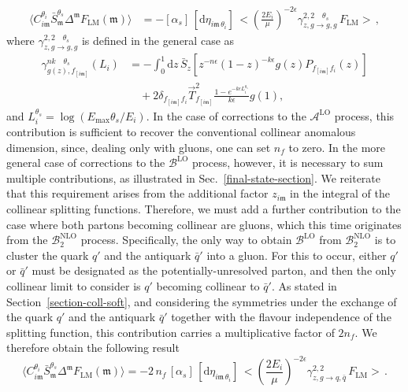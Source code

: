 \documentclass[a4paper, 12pt]{book}
\newcommand{\um}{\mathfrak{m}}
\begin{document}
\begin{equation}
  \begin{split}
  \langle C_{i\mathfrak{m}}^{\theta_i} \bar{S}_{\mathfrak{m}}^{\theta_s} \Delta^{\mathfrak{m}} F_{\mathrm{LM}}(\mathfrak{m})\rangle &= -[\alpha_s] \,[\mathrm{d}\eta_{i\um \, \theta_i}] \, \bigl< \left(\frac{2E_i}{\mu}\right)^{-2\epsilon} \gamma^{2,2 \quad \theta_s}_{z,g \to g, g} \, F_{\mathrm{LM}} \bigr> \, , 
  \label{coll-par-ggg}
  \end{split}
\end{equation}
where $\gamma^{2,2 \quad \theta_s}_{z,g \to g, g}$ is defined in the general case as
\begin{align}
  \gamma^{nk \quad \theta_s}_{g(z),f_{[i\um]}} (L_i) 
  &= - \int_0^1 \mathrm{d}z \, \bar{S}_z \left[z^{-n\epsilon}(1-z)^{-k\epsilon}g(z)P_{f_{[i\um]}f_i}(z)\right] \nonumber \\
  &\quad + 2 \delta_{f_{[i\um]}f_i} \vec{T}^2_{f_{[i\um]}} \frac{1-e^{-k \epsilon L_i^{\theta_s}}}{k\epsilon} g(1) ,
  \label{gen-an-dim-theta}
\end{align}
and $L_i^{\theta_s}=\log{\left(E_{\mathrm{max}}\theta_s/E_i\right)}$. In the case of corrections to the $\mathcal{A}^{\mathrm{LO}}$ process, this contribution is sufficient to recover the conventional collinear anomalous dimension, since, dealing only with gluons, one can set $n_f$ to zero. In the more general case of corrections to the $\mathcal{B}^{\mathrm{LO}}$ process, however, it is necessary to sum multiple contributions, as illustrated in Sec.~\ref{final-state-section}. We reiterate that this requirement arises from the additional factor $z_{i\um}$ in the integral of the collinear splitting functions. Therefore, we must add a further contribution to the case where both partons becoming collinear are gluons, which this time originates from the $\mathcal{B}_2^{\mathrm{NLO}}$ process. Specifically, the only way to obtain $\mathcal{B}^{\mathrm{LO}}$ from $\mathcal{B}_2^{\mathrm{NLO}}$ is to cluster the quark $q'$ and the antiquark $\bar{q}'$ into a gluon. For this to occur, either $q'$ or $\bar{q}'$ must be designated as the potentially-unresolved parton, and then the only collinear limit to consider is $q'$ becoming collinear to $\bar{q}'$. As stated in Section~\ref{section-coll-soft}, and considering the symmetries under the exchange of the quark $q'$ and the antiquark $\bar{q}'$ together with the flavour independence of the splitting function, this contribution carries a multiplicative factor of $2n_f$. We therefore obtain the following result
\begin{equation}
  \langle C_{i\mathfrak{m}}^{\theta_i} \bar{S}_{\mathfrak{m}}^{\theta_s} \Delta^{\mathfrak{m}} F_{\mathrm{LM}}(\mathfrak{m})\rangle = -2 \, n_f \, [\alpha_s] \,[\mathrm{d}\eta_{i\um \, \theta_i}] \, \bigl< \left(\frac{2E_i}{\mu}\right)^{-2\epsilon} \gamma^{2,2}_{z,g \to q, \bar{q}} \, F_{\mathrm{LM}} \bigr> \, . 
  \label{coll-par-gqq}
\end{equation}
\end{document}
